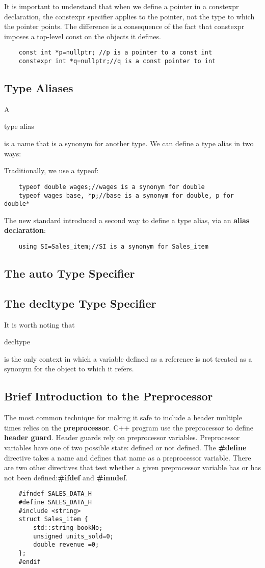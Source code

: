 \documentclass[UTF8]{ctexart}
\newcommand \qd[1] {\begin{qds} {#1} \end{qds}}
\begin{document}
It is important to understand that when we define a pointer in a constexpr declaration, the constexpr specifier applies to the pointer, not the type to which the pointer points. The difference is a consequence of the fact that constexpr imposes a top-level const on the objects it defines.
\begin{lstlisting}
	const int *p=nullptr; //p is a pointer to a const int
	constexpr int *q=nullptr;//q is a const pointer to int
\end{lstlisting}

\subsection{Type Aliases}
A \qd{type alias} is a name that is a synonym for another type. We can define a type alias in two ways:

Traditionally, we use a typeof:
\begin{lstlisting}
	typeof double wages;//wages is a synonym for double
	typeof wages base, *p;//base is a synonym for double, p for double*
\end{lstlisting}

The new standard introduced a second way to define a type alias, via an \textbf{alias declaration}:
\begin{lstlisting}
	using SI=Sales_item;//SI is a synonym for Sales_item
\end{lstlisting}

\subsection{The auto Type Specifier}

\subsection{The decltype Type Specifier}
It is worth noting that \qd{decltype} is the only context in which a variable defined as a reference is not treated as a synonym  for the object to which it refers.

\subsection{Brief Introduction to the Preprocessor}
The most common technique for making it safe to include a header multiple times relies on the \textbf{preprocessor}. C++ program use the preprocessor to define \textbf{header guard}. Header guards rely on preprocessor variables. Preprocessor variables have one of two possible state: defined or not defined. The \textbf{\#define} directive takes a name and defines that name as a preprocessor variable. There are two other directives that test whether a given preprocessor variable has or has not been defined:\textbf{\#ifdef} and \textbf{\#inndef}.
\begin{lstlisting}
	#ifndef SALES_DATA_H
	#define SALES_DATA_H
	#include <string>
	struct Sales_item {
		std::string bookNo;
		unsigned units_sold=0;
		double revenue =0;
	};
	#endif
\end{lstlisting}
\end{document}
